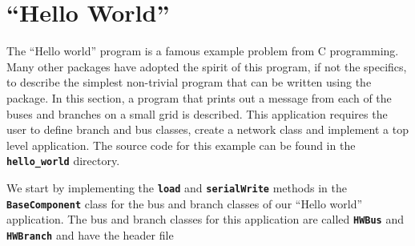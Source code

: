 \section{``Hello World''}\label{hello_world}

The ``Hello world'' program is a famous example problem from C programming. Many other packages have adopted the spirit of this program, if not the specifics, to describe the simplest non-trivial program that can be written using the package. In this section, a program that prints out a message from each of the buses and branches on a small grid is described. This application requires the user to define branch and bus classes, create a network class and implement a top level application. The source code for this example can be found in the \texttt{\textbf{hello\_world}} directory.

We start by implementing the \texttt{\textbf{load}} and \texttt{\textbf{serialWrite}} methods in the \texttt{\textbf{BaseComponent}} class for the bus and branch classes of our ``Hello world'' application. The bus and branch classes for this application are called \texttt{\textbf{HWBus}} and \texttt{\textbf{HWBranch}} and have the header file

